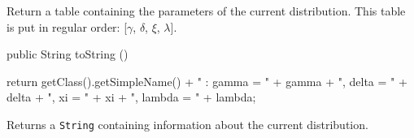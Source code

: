 \begin{tabb}
   Return a table containing the parameters of the current distribution.
   This table is put in regular order: [$\gamma$, $\delta$, $\xi$, $\lambda$].
\end{tabb}
\begin{hide}\begin{code}

   public String toString ()\begin{hide} {
      return getClass().getSimpleName() + " : gamma = " + gamma + ", delta = " + delta + ", xi = " + xi + ", lambda = " + lambda;
   }\end{hide}
\end{code}
\begin{tabb}
   Returns a \texttt{String} containing information about the current distribution.
\end{tabb}\end{hide}
\begin{code}\begin{hide}
}\end{hide}
\end{code}
